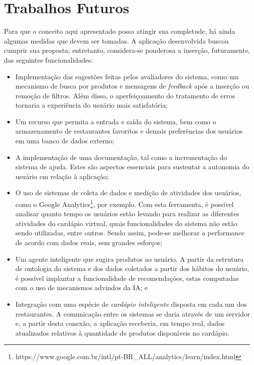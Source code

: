 \section{Trabalhos Futuros}

Para que o conceito aqui apresentado possa atingir sua completude, há ainda algumas medidas que devem ser tomadas. A aplicação desenvolvida buscou cumprir sua proposta; entretanto, considera-se ponderosa a inserção, futuramente, das seguintes funcionalidades:
\begin{itemize}
	\item Implementação das sugestões feitas pelos avaliadores do sistema, como um mecanismo de busca por produtos e mensagens de \emph{feedback} após a inserção ou remoção de filtros. Além disso, o aperfeiçoamento do tratamento de erros tornaria a experiência do usuário mais satisfatória;
	\item Um recurso que permita a entrada e saída do sistema, bem como o armazenamento de restaurantes favoritos e demais preferências dos usuários em uma banco de dados externo;
	\item A implementação de uma documentação, tal como a incrementação do sistema de ajuda. Estes são aspectos essenciais para sustentar a autonomia do usuário em relação à aplicação;
	\item O uso de sistemas de coleta de dados e medição de atividades dos usuários, como o Google Analytics\footnote{https://www.google.com.br/intl/pt-BR\_ALL/analytics/learn/index.html}, por exemplo. Com esta ferramenta, é possível analisar quanto tempo os usuários estão levando para realizar as diferentes atividades do cardápio virtual, quais funcionalidades do sistema não estão sendo utilizadas, entre outros. Sendo assim, pode-se melhorar a performance de acordo com dados reais, sem grandes esforços;
	\item Um agente inteligente que sugira produtos ao usuário. A partir da estrutura de ontologia do sistema e dos dados coletados a partir dos hábitos do usuário, é possível implantar a funcionalidade de recomendações, estas computadas com o uso de mecanismos advindos da IA; e
	\item Integração com uma espécie de \emph{cardápio inteligente} disposta em cada um dos restaurantes. A comunicação entre os sistemas se daria através de um servidor e, a partir desta conexão, a aplicação receberia, em tempo real, dados atualizados relativos à quantidade de produtos disponíveis no cardápio.
\end{itemize}